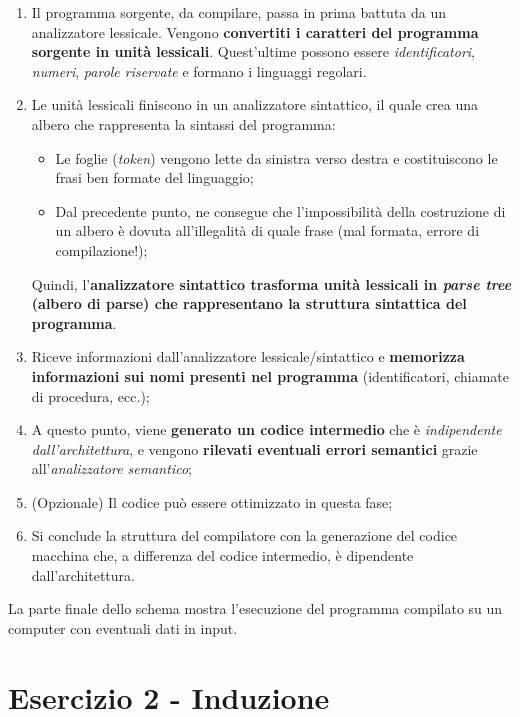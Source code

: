 \documentclass[a4paper]{article}
\begin{document}
	\begin{enumerate}
		\item Il programma sorgente, da compilare, passa in prima battuta da un analizzatore lessicale. Vengono \textbf{convertiti i caratteri del programma sorgente in unità lessicali}. Quest'ultime possono essere \emph{identificatori}, \emph{numeri}, \emph{parole riservate} e formano i linguaggi regolari.
		
		\item Le unità lessicali finiscono in un analizzatore sintattico, il quale crea una albero che rappresenta la sintassi del programma:
		\begin{itemize}
			\item Le foglie (\emph{token}) vengono lette da sinistra verso destra e costituiscono le frasi ben formate del linguaggio;
			
			\item Dal precedente punto, ne consegue che l'impossibilità della costruzione di un albero è dovuta all'illegalità di quale frase (mal formata, errore di compilazione!);
		\end{itemize}
		Quindi, l'\textbf{analizzatore sintattico trasforma unità lessicali in \emph{parse tree} (albero di parse) che rappresentano la struttura sintattica del programma}.
		
		\item Riceve informazioni dall'analizzatore lessicale/sintattico e \textbf{memorizza informazioni sui nomi presenti nel programma} (identificatori, chiamate di procedura, ecc.);
		
		\item A questo punto, viene \textbf{generato un codice intermedio} che è \emph{indipendente dall'architettura}, e vengono \textbf{rilevati eventuali errori semantici} grazie all'\emph{analizzatore semantico};
		
		\item (Opzionale) Il codice può essere ottimizzato in questa fase;
		
		\item Si conclude la struttura del compilatore con la generazione del codice macchina che, a differenza del codice intermedio, è dipendente dall'architettura.
	\end{enumerate}
	La parte finale dello schema mostra l'esecuzione del programma compilato su un computer con eventuali dati in input.\newpage
	
	\section{Esercizio 2 - Induzione}
	
\end{document}
